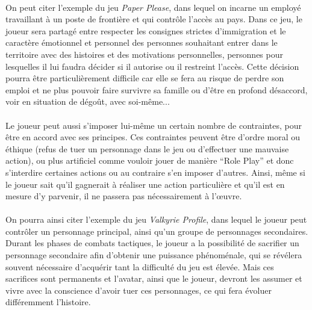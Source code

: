  \paragraph{}
On peut citer l’exemple du jeu \emph{Paper Please}, dans lequel on incarne un employé travaillant à un poste de frontière et qui contrôle l’accès au pays. Dans ce jeu, le joueur sera partagé entre respecter les consignes strictes d’immigration et le caractère émotionnel et personnel des personnes souhaitant entrer dans le territoire avec des histoires et des motivations personnelles, personnes pour lesquelles il lui faudra décider si il autorise ou il restreint l’accès. Cette décision pourra être particulièrement difficile car elle se fera au risque de perdre son emploi et ne plus pouvoir faire survivre sa famille ou d’être en profond désaccord, voir en situation de dégoût, avec soi-même...\paragraph{}
Le joueur peut aussi s’imposer lui-même un certain nombre de contraintes, pour être en accord avec ses principes. Ces contraintes peuvent être d’ordre moral ou éthique (refus de tuer un personnage dans le jeu ou d’effectuer une mauvaise action), ou plus artificiel comme vouloir jouer de manière “Role Play” et donc s’interdire certaines actions ou au contraire s’en imposer d’autres. Ainsi, même si le joueur sait qu’il gagnerait à réaliser une action particulière et qu’il est en mesure d’y parvenir, il ne passera pas nécessairement à l’œuvre. 
\paragraph{}On pourra ainsi citer l’exemple du jeu \emph{Valkyrie Profile}, dans lequel le joueur peut contrôler un personnage principal, ainsi qu’un groupe de personnages secondaires. Durant les phases de combats tactiques, le joueur a la possibilité de sacrifier un personnage secondaire afin d’obtenir une puissance phénoménale, qui se révélera souvent nécessaire d’acquérir tant la difficulté du jeu est élevée. Mais ces sacrifices sont permanents et l’avatar, ainsi que le joueur, devront les assumer et vivre avec la conscience d’avoir tuer ces personnages, ce qui fera évoluer différemment l’histoire.
